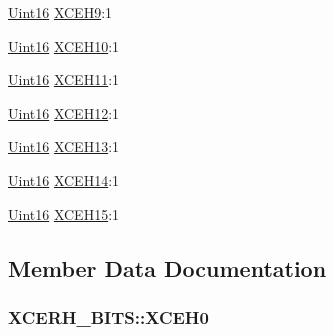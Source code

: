 \begin{DoxyCompactItemize}
\item 
\hyperlink{_d_s_p2833x___device_8h_a59a9f6be4562c327cbfb4f7e8e18f08b}{Uint16} \hyperlink{struct_x_c_e_r_h___b_i_t_s_a8bf3287bed117b69825a1e66b3a51b60}{X\+C\+E\+H9}\+:1
\item 
\hyperlink{_d_s_p2833x___device_8h_a59a9f6be4562c327cbfb4f7e8e18f08b}{Uint16} \hyperlink{struct_x_c_e_r_h___b_i_t_s_af49cae39798250b758db32d3cad264c8}{X\+C\+E\+H10}\+:1
\item 
\hyperlink{_d_s_p2833x___device_8h_a59a9f6be4562c327cbfb4f7e8e18f08b}{Uint16} \hyperlink{struct_x_c_e_r_h___b_i_t_s_a6b1263d151ad0967ad93e9909042da8d}{X\+C\+E\+H11}\+:1
\item 
\hyperlink{_d_s_p2833x___device_8h_a59a9f6be4562c327cbfb4f7e8e18f08b}{Uint16} \hyperlink{struct_x_c_e_r_h___b_i_t_s_a0435663ced1e35446a8c642ac368a085}{X\+C\+E\+H12}\+:1
\item 
\hyperlink{_d_s_p2833x___device_8h_a59a9f6be4562c327cbfb4f7e8e18f08b}{Uint16} \hyperlink{struct_x_c_e_r_h___b_i_t_s_ad6d7c7ff7f4e6290b6820b6b04465ac2}{X\+C\+E\+H13}\+:1
\item 
\hyperlink{_d_s_p2833x___device_8h_a59a9f6be4562c327cbfb4f7e8e18f08b}{Uint16} \hyperlink{struct_x_c_e_r_h___b_i_t_s_a4593725e336841fbecf209f67215f5f4}{X\+C\+E\+H14}\+:1
\item 
\hyperlink{_d_s_p2833x___device_8h_a59a9f6be4562c327cbfb4f7e8e18f08b}{Uint16} \hyperlink{struct_x_c_e_r_h___b_i_t_s_a527b9a01cf9f70502b6fefbb09b3a153}{X\+C\+E\+H15}\+:1
\end{DoxyCompactItemize}


\subsection{Member Data Documentation}
\hypertarget{struct_x_c_e_r_h___b_i_t_s_ad0342e8bd35c87b15a527aa268030c54}{}
\subsubsection[{X\+C\+E\+H0}]{ X\+C\+E\+R\+H\+\_\+\+B\+I\+T\+S\+::\+X\+C\+E\+H0}\label{struct_x_c_e_r_h___b_i_t_s_ad0342e8bd35c87b15a527aa268030c54}
\hypertarget{struct_x_c_e_r_h___b_i_t_s_a704810aeec0e508faffb1348b2a2c13f}{}
